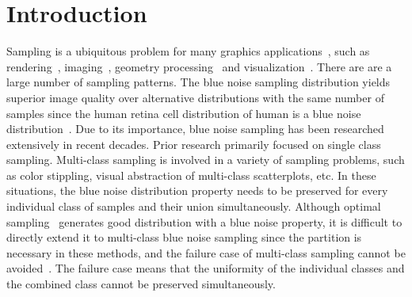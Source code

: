 \section{Introduction}
Sampling is a ubiquitous problem for many graphics applications~\cite{Lagae:2008:CPDD},
such as rendering~\cite{Mitchell:1987:generating},
imaging~\cite{Robert:1988:dithering},
geometry processing~\cite{Oztireli:10:Spectral}
and visualization~\cite{chen:2014:visual}.
There are are 
a large number of sampling patterns.
The blue noise sampling distribution yields superior
image quality over alternative distributions with the same
number of samples since the human retina cell distribution of
human is a blue noise distribution~\cite{Yellott:1983:retina}.
Due to its importance,
blue noise sampling has been researched extensively in recent decades.
Prior research primarily focused on single class sampling.
Multi-class  sampling is involved in a variety of sampling problems,
such as color stippling, visual abstraction of multi-class scatterplots,
etc.
In these situations,
the blue noise distribution property needs to be preserved for every individual class of samples
and their union simultaneously.
Although optimal
sampling~\cite{balzer:2009:capacity,chen:2012:variational,de:2012:blue}
 generates good distribution with a  blue noise property,
it is difficult to directly extend it to multi-class blue noise sampling since
the partition is necessary in these methods,
and the failure case of multi-class sampling cannot be avoided~\cite{wei:2010:multi,chen:2012:variational}.
 The failure case means that the uniformity of the individual classes and the combined class cannot be preserved simultaneously.



